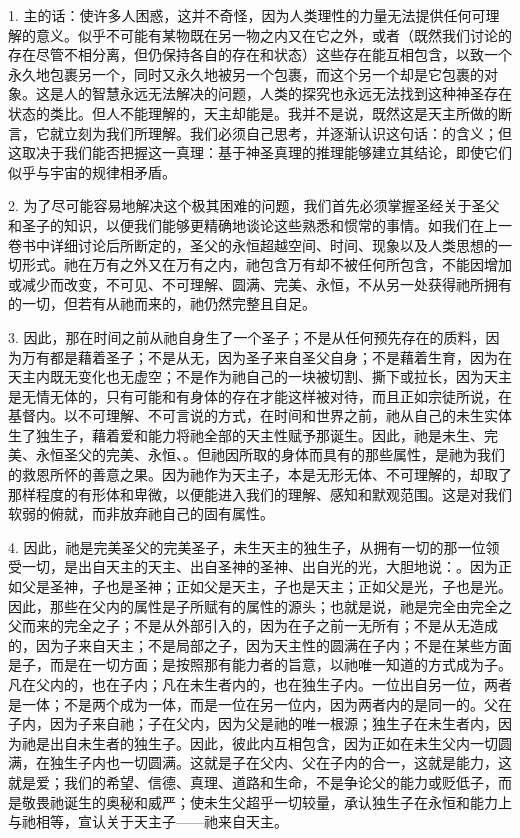 1. 主的话：使许多人困惑，这并不奇怪，因为人类理性的力量无法提供任何可理解的意义。似乎不可能有某物既在另一物之内又在它之外，或者（既然我们讨论的存在尽管不相分离，但仍保持各自的存在和状态）这些存在能互相包含，以致一个永久地包裹另一个，同时又永久地被另一个包裹，而这个另一个却是它包裹的对象。这是人的智慧永远无法解决的问题，人类的探究也永远无法找到这种神圣存在状态的类比。但人不能理解的，天主却能是。我并不是说，既然这是天主所做的断言，它就立刻为我们所理解。我们必须自己思考，并逐渐认识这句话：的含义；但这取决于我们能否把握这一真理：基于神圣真理的推理能够建立其结论，即使它们似乎与宇宙的规律相矛盾。\par

2. 为了尽可能容易地解决这个极其困难的问题，我们首先必须掌握圣经关于圣父和圣子的知识，以便我们能够更精确地谈论这些熟悉和惯常的事情。如我们在上一卷书中详细讨论后所断定的，圣父的永恒超越空间、时间、现象以及人类思想的一切形式。祂在万有之外又在万有之内，祂包含万有却不被任何所包含，不能因增加或减少而改变，不可见、不可理解、圆满、完美、永恒，不从另一处获得祂所拥有的一切，但若有从祂而来的，祂仍然完整且自足。\par

3. 因此，那在时间之前从祂自身生了一个圣子；不是从任何预先存在的质料，因为万有都是藉着圣子；不是从无，因为圣子来自圣父自身；不是藉着生育，因为在天主内既无变化也无虚空；不是作为祂自己的一块被切割、撕下或拉长，因为天主是无情无体的，只有可能和有身体的存在才能这样被对待，而且正如宗徒所说，在基督内。以不可理解、不可言说的方式，在时间和世界之前，祂从自己的未生实体生了独生子，藉着爱和能力将祂全部的天主性赋予那诞生。因此，祂是未生、完美、永恒圣父的完美、永恒、。但祂因所取的身体而具有的那些属性，是祂为我们的救恩所怀的善意之果。因为祂作为天主子，本是无形无体、不可理解的，却取了那样程度的有形体和卑微，以便能进入我们的理解、感知和默观范围。这是对我们软弱的俯就，而非放弃祂自己的固有属性。\par

4. 因此，祂是完美圣父的完美圣子，未生天主的独生子，从拥有一切的那一位领受一切，是出自天主的天主、出自圣神的圣神、出自光的光，大胆地说：。因为正如父是圣神，子也是圣神；正如父是天主，子也是天主；正如父是光，子也是光。因此，那些在父内的属性是子所赋有的属性的源头；也就是说，祂是完全由完全之父而来的完全之子；不是从外部引入的，因为在子之前一无所有；不是从无造成的，因为子来自天主；不是局部之子，因为天主性的圆满在子内；不是在某些方面是子，而是在一切方面；是按照那有能力者的旨意，以祂唯一知道的方式成为子。凡在父内的，也在子内；凡在未生者内的，也在独生子内。一位出自另一位，两者是一体；不是两个成为一体，而是一位在另一位内，因为两者内的是同一的。父在子内，因为子来自祂；子在父内，因为父是祂的唯一根源；独生子在未生者内，因为祂是出自未生者的独生子。因此，彼此内互相包含，因为正如在未生父内一切圆满，在独生子内也一切圆满。这就是子在父内、父在子内的合一，这就是能力，这就是爱；我们的希望、信德、真理、道路和生命，不是争论父的能力或贬低子，而是敬畏祂诞生的奥秘和威严；使未生父超乎一切较量，承认独生子在永恒和能力上与祂相等，宣认关于天主子——祂来自天主。\par

